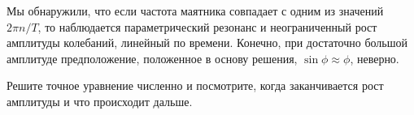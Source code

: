 \documentclass[a4paper,12pt]{article}
\theoremstyle{plain} %
\theoremstyle{definition} %
\theoremstyle{remark} %
\begin{document}
Мы обнаружили, что если частота маятника совпадает с одним из значений $2\pi n/T$, то наблюдается параметрический резонанс и неограниченный рост амплитуды колебаний, линейный по времени. Конечно, при достаточно большой амплитуде предположение, положенное в основу решения, $\sin \phi \approx \phi$, неверно.

Решите точное уравнение численно и посмотрите, когда заканчивается рост амплитуды и что происходит дальше.
\end{document}
